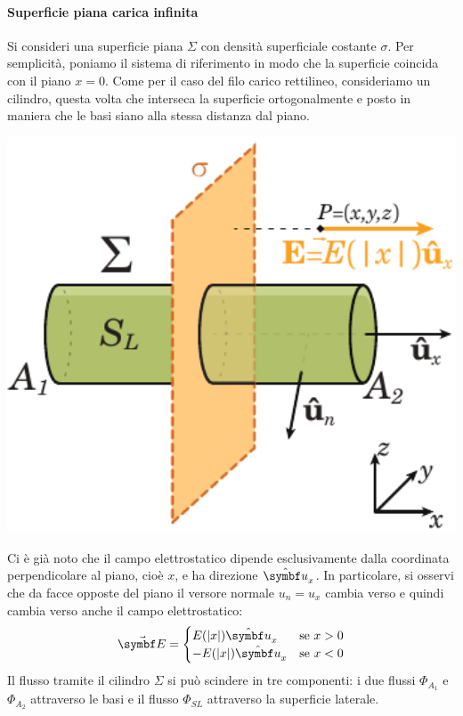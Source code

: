 \paragraph{Superficie piana carica infinita}\label{pianocarico}
Si consideri una superficie piana $\Sigma$ con densità superficiale costante $\sigma$. Per semplicità, poniamo il sistema di riferimento in modo che la superficie coincida con il piano $x=0$. Come per il caso del filo carico rettilineo, consideriamo un cilindro, questa volta che interseca la superficie ortogonalmente e posto in maniera che le basi siano alla stessa distanza dal piano.\\
\begin{minipage}{0.43\textwidth}
	\begin{center}
		\includegraphics[width=1\textwidth]{images/chp2/chp2superficieinfinita.pdf}
	\end{center}
\end{minipage}\hspace{10pt}
\begin{minipage}{0.56\textwidth}
	Ci è già noto che il campo elettrostatico dipende esclusivamente dalla coordinata perpendicolare al piano, cioè $x$, e ha direzione $\vbh{u}_x$. In particolare, si osservi che da facce opposte del piano il versore normale $u_n=u_x$ cambia verso e quindi cambia verso anche il campo elettrostatico:
	\begin{equation*}
		\vba{E}=
		\begin{cases}
			E(\abs{x})\vbh{u}_x&\text{se}\ x>0\\
			-E(\abs{x})\vbh{u}_x&\text{se}\ x<0
		\end{cases}
	\end{equation*}
	Il flusso tramite il cilindro $\Sigma$ si può scindere in tre componenti: i due flussi $\Phi_{A_1}$ e $\Phi_{A_2}$ attraverso le basi e il flusso $\Phi_{SL}$ attraverso la superficie laterale.
\end{minipage}\\
